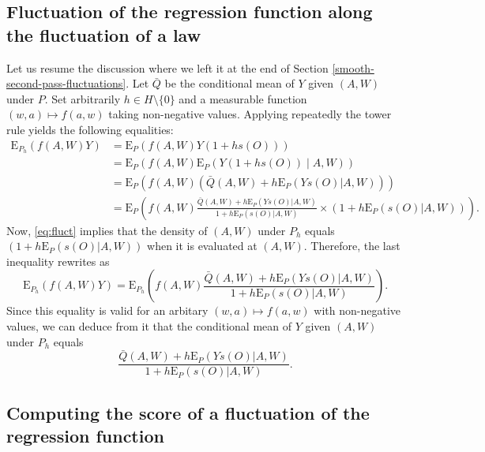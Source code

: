 \documentclass[11pt,openright,twoside]{book}
\newcommand{\Exp}{\textrm{E}}
\newcommand{\Qbar}{\bar{Q}}
\theoremstyle{definition}
\theoremstyle{definition}
\theoremstyle{definition}
\theoremstyle{remark}
\begin{document}
\hypertarget{fluct-reg}{%
\subsection{Fluctuation of the regression function along the fluctuation of a law}\label{fluct-reg}}

Let us resume the discussion where we left it at the end of Section
\ref{smooth-second-pass-fluctuations}. Let \(\Qbar\) be the conditional mean
of \(Y\) given \((A,W)\) under \(P\). Set arbitrarily \(h \in H \setminus \{0\}\) and
a measurable function \((w,a) \mapsto f(a,w)\) taking non-negative
values. Applying repeatedly the tower rule yields the following equalities:
\begin{align*} \Exp_{P_{h}}  \left(f(A,W) Y\right) &= \Exp_{P}  \left(f(A,W) Y
(1 + h  s(O))\right) \\ &= \Exp_{P} \left(f(A,W) \Exp_{P}\left(Y  (1 + h s(O))
\middle|A,W\right)\right)  \\ &=  \Exp_{P} \left(f(A,W)  \left(\Qbar(A,W) +  h
\Exp_{P}(Ys(O)   |   A,W)   \right)\right)   \\   &=   \Exp_{P}   \left(f(A,W)
\frac{\Qbar(A,W) + h  \Exp_{P}(Ys(O) | A,W)}{1 +  h \Exp_{P}(s(O)|A,W)} \times
\left(1 + h \Exp_{P}(s(O)|A,W)\right)\right).\end{align*} Now, \eqref{eq:fluct}
implies that the density of \((A,W)\) under \(P_{h}\) equals \(\left(1 + h \Exp_{P}(s(O)|A,W)\right)\) when it is evaluated at \((A,W)\). Therefore, the
last inequality rewrites as
\begin{equation*} 
\Exp_{P_{h}}  \left(f(A,W)
Y\right)  = \Exp_{P_{h}}  \left(f(A,W) \frac{\Qbar(A,W)  + h  \Exp_{P}(Ys(O) |
A,W)}{1 + h \Exp_{P}(s(O)|A,W)}\right).
\end{equation*}
Since this equality is valid
for an arbitary \((w,a) \mapsto f(a,w)\) with non-negative values, we can deduce
from it that the conditional mean of \(Y\) given \((A,W)\) under \(P_h\) equals
\begin{equation*}\frac{\Qbar(A,W)   +  h   \Exp_{P}(Ys(O)   |   A,W)}{1  +   h
\Exp_{P}(s(O)|A,W)}.\end{equation*}

\hypertarget{fluct-score}{%
\subsection{Computing the score of a fluctuation of the regression function}\label{fluct-score}}
\end{document}
